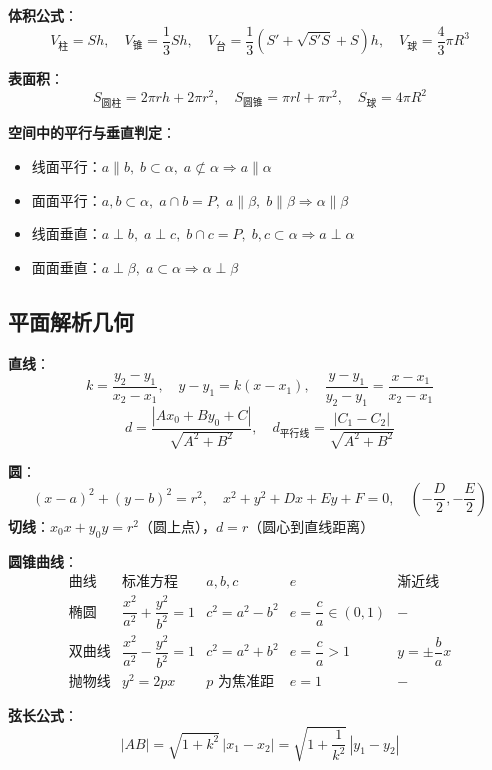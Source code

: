 \textbf{体积公式}：
\[
V_{\text{柱}} = Sh,\quad V_{\text{锥}} = \frac13 Sh,\quad
V_{\text{台}} = \frac13 (S'+\sqrt{S'S}+S)h,\quad
V_{\text{球}} = \frac43 \pi R^3
\]

\textbf{表面积}：
\[
S_{\text{圆柱}} = 2\pi rh + 2\pi r^2,\quad
S_{\text{圆锥}} = \pi rl + \pi r^2,\quad
S_{\text{球}} = 4\pi R^2
\]

\textbf{空间中的平行与垂直判定}：
\begin{itemize}
  \item 线面平行：$a \parallel b,\; b\subset \alpha,\; a\not\subset \alpha \Rightarrow a\parallel \alpha$
  \item 面面平行：$a,b\subset\alpha,\;a\cap b=P,\;a\parallel\beta,\;b\parallel\beta \Rightarrow \alpha\parallel\beta$
  \item 线面垂直：$a\perp b,\;a\perp c,\;b\cap c=P,\;b,c\subset\alpha \Rightarrow a\perp\alpha$
  \item 面面垂直：$a\perp\beta,\;a\subset\alpha \Rightarrow \alpha\perp\beta$
\end{itemize}

\subsection{平面解析几何}

\textbf{直线}：
\[
k = \frac{y_2-y_1}{x_2-x_1},\quad
y-y_1 = k(x-x_1),\quad
\frac{y-y_1}{y_2-y_1} = \frac{x-x_1}{x_2-x_1}
\]
\[
d = \frac{|Ax_0+By_0+C|}{\sqrt{A^2+B^2}},\quad
d_{\text{平行线}} = \frac{|C_1-C_2|}{\sqrt{A^2+B^2}}
\]

\textbf{圆}：
\[
(x-a)^2 + (y-b)^2 = r^2,\quad
x^2+y^2+Dx+Ey+F=0,\quad
\left(-\frac{D}{2},-\frac{E}{2}\right)
\]
\textbf{切线}：$x_0x + y_0y = r^2$（圆上点），$d = r$（圆心到直线距离）

\textbf{圆锥曲线}：
\[
\begin{array}{c|c|c|c|c}
\text{曲线} & \text{标准方程} & a,b,c & e & \text{渐近线} \\ \hline
\text{椭圆} & \dfrac{x^2}{a^2}+\dfrac{y^2}{b^2}=1 & c^2=a^2-b^2 & e=\dfrac{c}{a}\in(0,1) & - \\
\text{双曲线} & \dfrac{x^2}{a^2}-\dfrac{y^2}{b^2}=1 & c^2=a^2+b^2 & e=\dfrac{c}{a}>1 & y=\pm\dfrac{b}{a}x \\
\text{抛物线} & y^2=2px & p\text{ 为焦准距} & e=1 & -
\end{array}
\]

\textbf{弦长公式}：
\[
|AB| = \sqrt{1+k^2}\,|x_1-x_2| = \sqrt{1+\frac{1}{k^2}}\,|y_1-y_2|
\]

